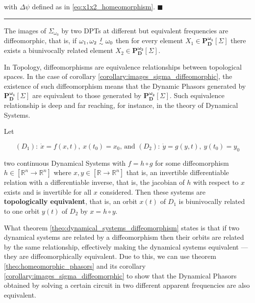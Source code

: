 	\noindent with $\Delta\psi$ defined as in \eqref{eq:x1x2_homeomorphism}. \hfill$\blacksquare$\vspace{5mm}\hrule\vspace{5mm}

\begin{corollary} \label{corollary:images_sigma_diffeomorphic} The images of $\Sigma_{\omega_0}$ by two DPTs at different but equivalent frequencies are diffeomorphic, that is, if $\omega_1,\omega_2\ \substack{ I \\ \sim}\ \omega_0$ then for every element $X_1\in\mathbf{P_D^{\omega_1}}\left[\Sigma\right]$ there exists a biunivocally related element $X_2\in\mathbf{P_D^{\omega_2}}\left[\Sigma\right]$.
\end{corollary}

	In Topology, diffeomorphisms are equivalence relationships between topological spaces. In the case of corollary \ref{corollary:images_sigma_diffeomorphic}, the existence of such diffeomorphism means that the Dynamic Phasors generated by $\mathbf{P_D^{\omega_1}}\left[\Sigma\right]$ are equivalent to those generated by $\mathbf{P_D^{\omega_2}}\left[\Sigma\right]$. Such equivalence relationship is deep and far reaching, for instance, in the theory of Dynamical Systems.

\begin{theorem} \label{theo:dynamical_systems_diffeomorphism}
	Let

\begin{equation} \left(D_1\right):\ \dot{x} = f\left(x,t\right),\ x\left(t_0\right) = x_0 \text{, and } \left(D_2\right):\ \dot{y} = g\left(y,t\right),\ y\left(t_0\right) = y_0 \end{equation}

	\noindent two continuous Dynamical Systems with $f = h\circ g$ for some diffeomorphism $h\in\left[\mathbb{R}^n\to\mathbb{R}^n\right]$ where $x,y\in\left[\mathbb{R}\to\mathbb{R}^n\right]$ that is, an invertible differentiable relation with a differentiable inverse, that is, the jacobian of $h$ with respect to $x$ exists and is invertible for all $x$ considered. Then these systems are \textbf{topologically equivalent}, that is, an orbit $x(t)$ of $D_1$ is biunivocally related to one orbit $y(t)$ of $D_2$ by $x = h\circ y$.
\end{theorem}

	What theorem \ref{theo:dynamical_systems_diffeomorphism} states is that if two dynamical systems are related by a diffeomorphism then their orbits are related by the same relationship, effectively making the dynamical systems equivalent — they are diffeomorphically equivalent. Due to this, we can use theorem \ref{theo:homeomorphic_phasors} and its corollary \ref{corollary:images_sigma_diffeomorphic} to show that the Dynamical Phasors obtained by solving a certain circuit in two different apparent frequencies are also equivalent.


